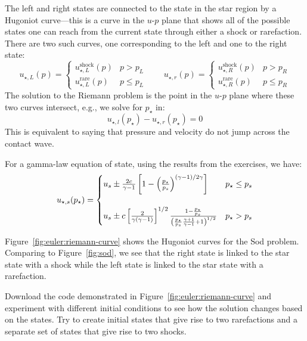 The left and right states are connected to the state in the star
region by a Hugoniot curve---this is a curve in the $u$-$p$ plane that
shows all of the possible states one can reach from the current state
through either a shock or rarefaction.  There are two such curves, one
corresponding to the left and one to the right state:
\begin{equation}
u_{\star,L}(p) = \begin{cases}
   u_{\star,L}^\mathrm{shock}(p) & p > p_L \\
   u_{\star,L}^\mathrm{rare}(p) & p \le p_L
   \end{cases}
\qquad
u_{\star,r}(p) = \begin{cases}
   u_{\star,R}^\mathrm{shock}(p) & p > p_R \\
   u_{\star,R}^\mathrm{rare}(p) & p \le p_R
   \end{cases}
\end{equation}
The solution
to the Riemann problem is the point in the $u$-$p$ plane where these
two curves intersect, e.g., we solve for $p_\star$ in:
\begin{equation}
u_{\star,l}(p_\star) - u_{\star,r}(p_\star) = 0
\end{equation}
This is equivalent to saying that pressure and velocity do not jump
across the contact wave.

For a gamma-law equation of state, using the results from the
exercises, we have:
\begin{equation}
\renewcommand{\arraystretch}{1.5}
u_{\star,s}(p_\star) = \begin{cases}
  u_s \pm \frac{2c}{\gamma - 1} \left [ 1 - \left ( \frac{p_\star}{p_s}\right )^{(\gamma - 1)/2\gamma} \right ] & p_\star \le p_s \\
\\
%
  u_s \pm c \left [\frac{2}{\gamma(\gamma - 1)}\right]^{1/2} \frac{1 - \frac{p_\star}{p_s}}{\left ( \frac{p_\star}{p_s} \frac{\gamma + 1}{\gamma - 1} + 1\right)^{1/2}} & p_\star > p_s
\end{cases}
\renewcommand{\arraystretch}{1.0}
\end{equation}



Figure~\ref{fig:euler:riemann-curve} shows the Hugoniot curves for the
Sod problem.  Comparing to Figure~\ref{fig:sod}, we see that the right
state is linked to the star state with a shock while the left state is
linked to the star state with a rarefaction.

\begin{exercise}
Download the code demonstrated in Figure~\ref{fig:euler:riemann-curve}
and experiment with different initial conditions to see how the
solution changes based on the states.  Try to create initial states
that give rise to two rarefactions and a separate set of states that
give rise to two shocks.
\end{exercise}

